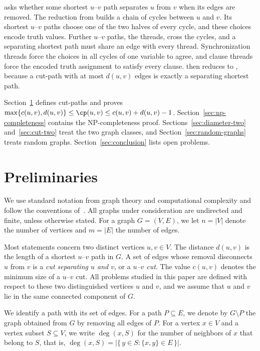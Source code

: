 \SSP{} asks whether some shortest $u$--$v$ path separates $u$ from $v$ when its edges are removed.
The reduction from \ThreeSAT{} builds a chain of cycles between $u$ and $v$.
Its shortest $u$--$v$ paths choose one of the two halves of every cycle, and these choices encode truth values.
Further $u$--$v$ paths, the threads, cross the cycles, and a separating shortest path must share an edge with every thread.
Synchronization threads force the choices in all cycles of one variable to agree, and clause threads force the encoded truth assignment to satisfy every clause.
\SSP{} then reduces to \MinCutPath{}, because a cut-path with at most $d(u,v)$ edges is exactly a separating shortest path.

Section~\ref{sec:fundamentals} defines cut-paths and proves $\max\{c(u,v), d(u,v)\} \leq \cp(u,v) \leq c(u,v) + d(u,v) - 1$.
Section~\ref{sec:np-completeness} contains the NP-completeness proof.
Sections~\ref{sec:diameter-two} and~\ref{sec:cut-two} treat the two graph classes, and Section~\ref{sec:random-graphs} treats random graphs.
Section~\ref{sec:conclusion} lists open problems.

\section{Preliminaries}
\label{sec:fundamentals}

We use standard notation from graph theory and computational complexity and follow the conventions of~\cite{Diestel2025,Cormen2022}.
All graphs under consideration are undirected and finite, unless otherwise stated.
For a graph $G = (V, E)$, we let $n = |V|$ denote the number of vertices and $m = |E|$ the number of edges.

Most statements concern two distinct vertices $u, v \in V$.
The distance $d(u, v)$ is the length of a shortest $u$--$v$ path in $G$.
A set of edges whose removal disconnects $u$ from $v$ is a \emph{cut separating $u$ and $v$}, or a \emph{$u$--$v$ cut}.
The value $c(u, v)$ denotes the minimum size of a $u$--$v$ cut.
All problems studied in this paper are defined with respect to these two distinguished vertices $u$ and $v$, and we assume that $u$ and $v$ lie in the same connected component of $G$.

We identify a path with its set of edges.
For a path $P \subseteq E$, we denote by $G \setminus P$ the graph obtained from $G$ by removing all edges of $P$.
For a vertex $x \in V$ and a vertex subset $S \subseteq V$, we write $\deg(x, S)$ for the number of neighbors of $x$ that belong to $S$, that is, $\deg(x, S) = |\{\,y \in S : \{x, y\} \in E\,\}|$.

